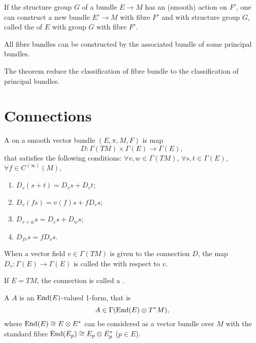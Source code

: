\documentclass[openany, oneside, a5paper]{book}
\begin{document}
\begin{definition}
    If the structure group $G$ of a bundle $E \to M$ has an (smooth) action on $F'$, one can construct a new bundle $E' \to M$ with fibre $F'$ and with structure group $G$, called the  of $E$ with group $G$ with fibre $F'$.
\end{definition}

\begin{theorem}
    All fibre bundles can be constructed by the associated bundle of some principal bundles.
\end{theorem}

The theorem reduce the classification of fibre bundle to the classification of principal bundles.

\section{Connections}

\begin{definition}[Connection]
    A  on a smooth vector bundle $(E, \pi, M, F)$ is map
    \begin{equation}
        D \colon \Gamma(TM) \times \Gamma(E) \to \Gamma(E),
    \end{equation}
    that satisfies the following conditions:
    $\forall v, w \in \Gamma(TM)$, $\forall s, t \in \Gamma(E)$, $\forall f \in C^{(\infty)}(M)$,
    \begin{enumerate}[label=(\alph*)]
        \item $D_v (s + t) = D_v s + D_v t$;
        \item $D_v (fs) = v(f) s +  f D_v s$;
        \item $D_{v + w} s = D_v s + D_w s$;
        \item $D_{fv} s = f D_v s$.
    \end{enumerate}
\end{definition}

When a vector field $v \in \Gamma(TM)$ is given to the connection $D$, the map $D_v \colon \Gamma(E) \to \Gamma(E)$ is called the  with respect to $v$.

If $E = TM$, the connection is called a .

\begin{definition}
    A  $A$ is an $\operatorname{End}(E)$-valued 1-form, that is
    \begin{equation}
        A \in \Gamma(\operatorname{End}(E) \otimes T^*M),
    \end{equation}
    where $\operatorname{End}(E) \cong E \otimes E^*$ can be considered as a vector bundle over $M$ with the standard fibre $\operatorname{End}(E_p) \cong E_p \otimes E_p^*$ ($p \in E$).
\end{definition}
\end{document}
